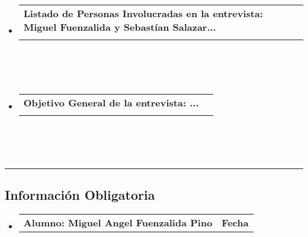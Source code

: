 \documentclass[10pt,letterpaper]{article}
\makeatletter
\newcommand{\headerrow}[2]
{\begin{tabular*}{\linewidth}{l@{\extracolsep{\fill}}r}
	#1 &
	#2 \\
\end{tabular*}}
\makeatother
\begin{document}
\begin{itemize}
	\parskip=0.1em

	\item
	\headerrow
		{\textbf{Listado de Personas Involucradas en la entrevista: Miguel Fuenzalida y Sebastían Salazar...}}
	\\
	\\
	\\
	\\
	\item
	\headerrow
		{\textbf{Objetivo General de la entrevista: ...}}
	\\
	\\
	\\
	\\

\end{itemize}


\hrule
\vspace{-0.4em}
\subsection*{Información Obligatoria}

\begin{itemize}
	\parskip=0.1em

	\item 
	\headerrow
		{\textbf{Alumno: Miguel Angel Fuenzalida Pino}}
		{\textbf{Fecha}}

\end{itemize}
\end{document}
